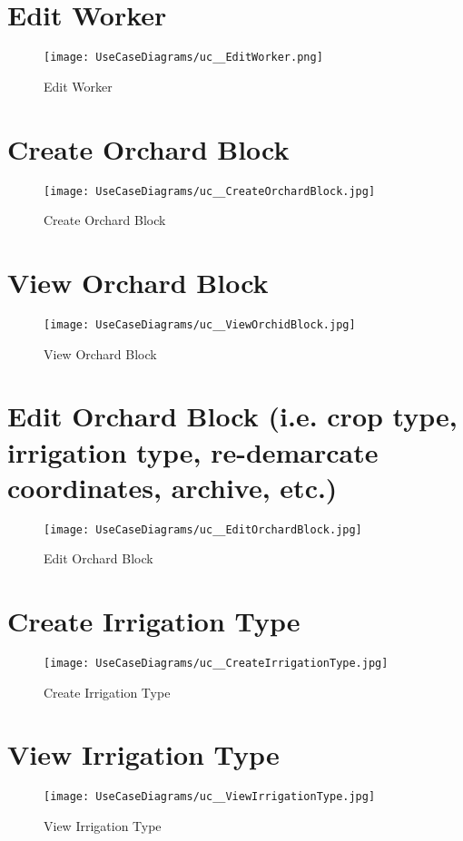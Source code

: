 \documentclass[11pt,fleqn]{book} %
\begin{document}
	\section{Edit Worker}
	\begin{figure}
		\texttt{[image: UseCaseDiagrams/uc\_\_EditWorker.png]}
		\caption{Edit Worker}
	\end{figure}

	\section{Create Orchard Block}
	\begin{figure}
		\texttt{[image: UseCaseDiagrams/uc\_\_CreateOrchardBlock.jpg]}
		\caption{Create Orchard Block}
	\end{figure}
	
	\section{View Orchard Block}
	\begin{figure}
		\texttt{[image: UseCaseDiagrams/uc\_\_ViewOrchidBlock.jpg]}
		\caption{View Orchard Block}
	\end{figure}
	
	\section{Edit Orchard Block (i.e. crop type, irrigation type, re-demarcate coordinates, archive, etc.)}
	\begin{figure}
		\texttt{[image: UseCaseDiagrams/uc\_\_EditOrchardBlock.jpg]}
		\caption{Edit Orchard Block}
	\end{figure}
	
	\section{Create Irrigation Type}
	\begin{figure}
		\texttt{[image: UseCaseDiagrams/uc\_\_CreateIrrigationType.jpg]}
		\caption{Create Irrigation Type}
	\end{figure}
	
	\section{View Irrigation Type}
	\begin{figure}
		\texttt{[image: UseCaseDiagrams/uc\_\_ViewIrrigationType.jpg]}
		\caption{View Irrigation Type}
	\end{figure}
	
\end{document}
